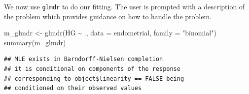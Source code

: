 \documentclass[
  ignorenonframetext,
]{beamer}
\newenvironment{Shaded}{\begin{snugshade}}{\end{snugshade}}
\newcommand{\AttributeTok}[1]{\textcolor[rgb]{0.77,0.63,0.00}{#1}}
\newcommand{\FunctionTok}[1]{\textcolor[rgb]{0.00,0.00,0.00}{#1}}
\newcommand{\NormalTok}[1]{#1}
\newcommand{\OtherTok}[1]{\textcolor[rgb]{0.56,0.35,0.01}{#1}}
\newcommand{\SpecialCharTok}[1]{\textcolor[rgb]{0.00,0.00,0.00}{#1}}
\newcommand{\StringTok}[1]{\textcolor[rgb]{0.31,0.60,0.02}{#1}}
\begin{document}
\begin{frame}[fragile]{}
\protect\hypertarget{section-18}{}
We now use \texttt{glmdr} to do our fitting. The user is prompted with a
description of the problem which provides guidance on how to handle the
problem.

\vspace{12pt}
\tiny

\begin{Shaded}
\begin{Highlighting}[]
\NormalTok{m\_glmdr }\OtherTok{\textless{}{-}} \FunctionTok{glmdr}\NormalTok{(HG }\SpecialCharTok{\textasciitilde{}}\NormalTok{ ., }\AttributeTok{data =}\NormalTok{ endometrial, }\AttributeTok{family =} \StringTok{"binomial"}\NormalTok{)}
\FunctionTok{summary}\NormalTok{(m\_glmdr)}
\end{Highlighting}
\end{Shaded}

\begin{verbatim}
## MLE exists in Barndorff-Nielsen completion
## it is conditional on components of the response
## corresponding to object$linearity == FALSE being
## conditioned on their observed values
\end{verbatim}


\end{frame}
\end{document}
